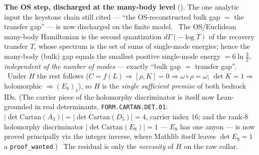 \documentclass[11pt,a4paper]{article}
\begin{document}
\par\smallskip\noindent\textbf{The OS step, discharged at the many-body level}
(). The one analytic input the keystone chain still cited --- ``the
OS-reconstructed bulk gap $=$ the transfer gap'' --- is now discharged on the finite model. \mE\ The OS/Euclidean
many-body Hamiltonian is the second quantization $d\Gamma(-\log T)$ of the recovery transfer $T$, whose spectrum is
the set of sums of single-mode energies; hence the many-body (bulk) gap equals the smallest positive single-mode
energy $=6\ln\tfrac32$, \emph{independent of the number of modes} --- exactly ``bulk gap $=$ transfer gap''. \mE\
Under $H$ the rest follows ($C{=}f(L)\Rightarrow[\rho,K]{=}0\Rightarrow\omega\circ\rho{=}\omega$; $\det K{=}1\Rightarrow$
holomorphic $\Rightarrow(E_8)_1$), so $H$ is the \emph{single sufficient premise} of both bedrock IDs. (The carrier
piece of the holomorphy discriminator is itself now Lean-grounded in real determinants, \texttt{FORM.CARTAN.DET.01}:
$|\det\mathrm{Cartan}(A_3)|{=}|\det\mathrm{Cartan}(D_5)|{=}4$, carrier index $16$; and the rank-8 holomorphy
discriminator $|\det\mathrm{Cartan}(E_8)|{=}1$ --- $E_8$ has one anyon --- is now proved principally via the
integer inverse, where Mathlib itself leaves $\det E_8{=}1$ a \texttt{proof\_wanted}.) \mO\ The residual is only the
\emph{necessity} of $H$ on the raw collar.
\end{document}
